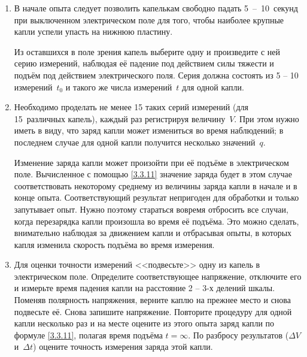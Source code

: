 \begin{lab:task}
\begin{enumerate}
{Для уменьшения ошибок в определении~$t_0$ и~$t$ нужно для пуска и остановки
секундомера использовать один и тот же признак~--- всегда нажимать головку
секундомера либо в тот момент, когда капля скрывается за линией шкалы, либо,
наоборот, когда она появляется из-за линии. Рекомендуется следить за каплей, не
отрываясь от окуляра микроскопа, так как в противном случае легко её потерять из
виду и весь эксперимент придётся повторить.}

\item{В начале опыта следует позволить капелькам свободно падать \mbox{5 --
10}~секунд при выключенном электрическом поле для того, чтобы наиболее крупные
капли успели упасть на нижнюю пластину.

Из оставшихся в поле зрения капель выберите одну и произведите с ней серию
измерений, наблюдая её падение под действием силы тяжести и подъём под действием
электрического поля. Серия должна состоять из 5 -- 10 измерений~$t_0$ и такого
же числа измерений~$t$ для одной капли.}

\item{Необходимо проделать не менее 15 таких серий измерений (для 15~различных
капель), каждый раз регистрируя величину~$V$. При этом нужно иметь в виду, что
заряд капли может измениться во время наблюдений; в последнем случае для одной
капли получится несколько значений~$q$.

Изменение заряда капли может произойти при её подъёме в электрическом поле.
Вычисленное с помощью \eqref{3.3.11} значение заряда будет в этом случае
соответствовать некоторому среднему из величины заряда капли в начале и в конце
опыта. Соответствующий результат непригоден для обработки и только запутывает
опыт. Нужно поэтому стараться вовремя отбросить все случаи, когда перезарядка
капли произошла во время её подъёма. Это можно сделать, внимательно наблюдая за
движением капли и отбрасывая опыты, в которых капля изменила скорость подъёма во
время измерения.}

\item{Для оценки точности измерений <<подвесьте>> одну из капель в электрическом
поле. Определите соответствующее напряжение, отключите его  и измерьте время
падения капли на расстояние 2 -- 3-х делений шкалы. Поменяв полярность
напряжения, верните каплю на прежнее место и снова подвесьте её. Снова запишите
напряжение. Повторите  процедуру  для одной капли несколько раз  и на месте
оцените из этого опыта заряд капли по формуле \eqref{3.3.11}, полагая время
подъёма $t=\infty$. По разбросу результатов ($\Delta V$ и~$\Delta t$) оцените
точность измерения заряда этой капли.}


\end{enumerate}
\end{lab:task}
